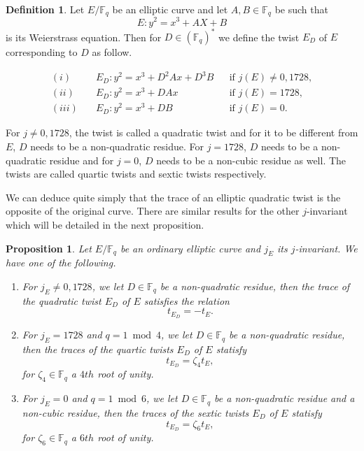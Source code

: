 \documentclass[12pt]{article}
\theoremstyle{plain}
\newtheorem{proposition}[theorem]{Proposition}
\theoremstyle{definition}
\newtheorem{definition}[theorem]{Definition}
\def\F{\ensuremath{\mathbb{F}}}
\begin{document}
\begin{definition}
Let $E/\F_q$ be an elliptic curve and let $A,B\in\F_q$ be such that
\begin{equation}
E : y^2 = x^3 + AX + B
\end{equation}
is its Weierstrass equation. Then for $D\in(\F_q)^*$ we define the twist $E_D$
of $E$ corresponding to $D$ as follow.

\begin{equation*}
\begin{aligned}
(i)\quad & E_D : y^2 = x^3 + D^2Ax + D^3B && \text{if } j(E)\neq0,1728,\\
(ii)\quad & E_D : y^2 = x^3 + DAx && \text{if } j(E)=1728,\\
(iii)\quad & E_D : y^2 = x^3 + DB && \text{if } j(E)=0.
\end{aligned}
\end{equation*}

\end{definition}

For $j\neq0,1728$, the twist is called a quadratic twist and for it to be
different from $E$, $D$ needs to be a non-quadratic residue. For $j=1728$, $D$
needs to be a non-quadratic residue and for $j = 0$, $D$ needs to be a
non-cubic residue as well. The twists are called quartic twists and sextic twists
respectively.\par
We can deduce quite simply that the trace of an elliptic quadratic twist is the
opposite of the original curve. There are similar results for the other 
$j$-invariant which will be detailed in the next proposition.

\begin{proposition}
\label{proposition:twisttrace}
Let $E/\F_q$ be an ordinary elliptic curve and $j_E$ its $j$-invariant. We have
one of the following.

\begin{enumerate}
    \item For $j_E\neq0,1728$, we let $D\in\F_q$ be a non-quadratic residue, then
the trace of the quadratic twist $E_D$ of $E$ satisfies the relation
\begin{equation}
t_{E_D} = -t_E.
\end{equation}

    \item For $j_E=1728$ and $q=1\bmod4$, we let $D\in\F_q$ be a non-quadratic 
residue, then the traces of the quartic twists $E_D$ of $E$ statisfy
\begin{equation}
t_{E_D} = \zeta_4t_E,
\end{equation}
for $\zeta_4\in\F_q$ a $4th$ root of unity.

    \item For $j_E=0$ and $q=1\bmod6$, we let $D\in\F_q$ be a non-quadratic
residue and a non-cubic residue, then the
traces of the sextic twists $E_D$ of $E$ statisfy
\begin{equation}
t_{E_D} = \zeta_6t_E,
\end{equation}
for $\zeta_6\in\F_q$ a $6th$ root of unity.
\end{enumerate}

\end{proposition}
\end{document}
